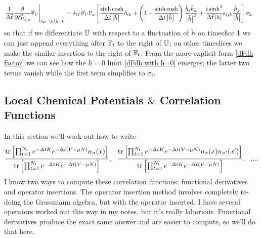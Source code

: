 \begin{align}
	\left.\frac{1}{\Delta\tilde{t}}\frac{\partial}{\partial \delta \tilde{h}^i_{t,a}} \mathbb{F}_{t'}\right|_{\delta\tilde{\mu} = 0, \delta \tilde{h}=0}
	&= \delta_{tt'} \mathbb{F}_{t'} \mathbb{P}_a \left[
				\frac{\sinh \cosh}{\Delta\tilde{t}\left| \tilde{h} \right|} \delta_{ik}
			+	\left(1 - \frac{\sinh \cosh}{\Delta\tilde{t}\left| \tilde{h} \right|}\right) \frac{\tilde{h}_i\tilde{h}_k}{\left| \tilde{h} \right|^2}
			+	\frac{i \sinh^2}{\Delta\tilde{t} \left| h \right|} \epsilon_{ijk} \frac{\tilde{h}_j}{\left| \tilde{h} \right|}
		\right]\sigma_k
	\label{eq:dFdh factor}
\end{align}
so that if we differentiate $\mathbb{U}$ with respect to a fluctuation of $\tilde{h}$ on timeslice 1 we can just append everything after $\mathbb{F}_t$ to the right of $\mathbb{U}$; on other timeslices we make the similar insertion to the right of $\mathbb{F}_t$.
From the more explicit form \eqref{dFdh factor} we can see how the $\tilde{h}=0$ limit \eqref{dFdh with h=0} emerges; the latter two terms vanish while the first term simplifies to $\sigma_i$.



\subsection{Local Chemical Potentials $\&$ Correlation Functions}
In this section we'll work out how to write
\begin{equation*}
\frac{\text{tr}\left[\prod_{t=1}^{N_t} e^{-\Delta t K }  e^{-\Delta t (V -\mu N)} n_{\sigma}(x)\right]}{\text{tr}\left[\prod_{t=1}^{N_t} e^{-\Delta t K }  e^{-\Delta t (V -\mu N)}  \right] }, ~~ \frac{ \text{tr}\left[\prod_{t=1}^{N_t} e^{-\Delta t K }  e^{-\Delta t (V -\mu N)} n_{\sigma}(x) n_{\sigma'}(x')\right] }{ \text{tr}\left[\prod_{t=1}^{N_t} e^{-\Delta t K }  e^{-\Delta t (V -\mu N)}  \right] }, ~~ ....
\end{equation*}
I know two ways to compute these correlation functions: functional derivatives and operator insertions. The operator insertion method involves completely re-doing the Grassmann algebra, but with the operator inserted. I have several operators worked out this way in my notes, but it's really laborious. Functional derivatives produce the exact same answer and are easier to compute, so we'll do that here.

